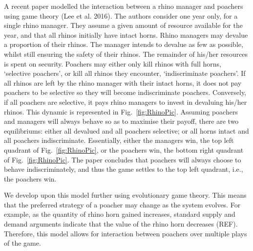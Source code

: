 \documentclass[10pt]{article}
\begin{document}
A recent paper modelled the interaction between a rhino manager and poachers using game theory (Lee et al. 2016). The authors consider one year only, for a single rhino manager. They assume a given amount of resource available for the year, and that all rhinos initially have intact horns. Rhino managers may devalue a proportion of their rhinos. The manager intends to devalue as few as possible, whilst still ensuring the safety of their rhinos. The remainder of his/her resources is spent on security. Poachers may either only kill rhinos with full horns, `selective poachers', or kill all rhinos they encounter, `indiscriminate poachers'. If all rhinos are left by the rhino manager with their intact horns, it does not pay poachers to be selective so they will become indiscriminate poachers.
Conversely, if all poachers are selective, it pays rhino managers to invest in devaluing his/her rhinos. This dynamic is represented in Fig.~\ref{fig:RhinoPic}. Assuming poachers and managers will always behave so as to maximise their payoff, there are two equilibriums: either all devalued and all poachers selective; or all horns intact and all poachers indiscriminate. Essentially, either the managers win, the top left quadrant
of Fig.~\ref{fig:RhinoPic}, or the poachers win, the bottom right quadrant of Fig.~\ref{fig:RhinoPic}. The paper concludes that poachers will always choose to behave indiscriminately, and thus the game settles to the top left quadrant, i.e., the poachers win. 

We develop upon this model further using evolutionary game theory. This means that the preferred strategy of a poacher may change as the system evolves. For example, as the quantity of rhino horn gained increases, standard supply and demand arguments indicate that the value of the rhino horn decreases (REF). Therefore, this model allows for interaction between poachers over multiple plays of the game. 
\end{document}
